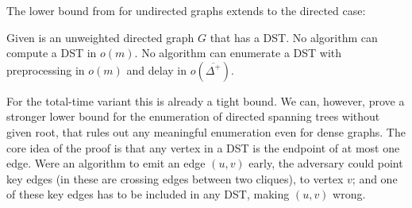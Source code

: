 \documentclass[a4paper, USenglish, cleveref, autoref, thm-restate]{lipics-v2021}
\newcommand{\avgoutdeg}{\overline{\Delta^+}}
\begin{document}
The lower bound from  for undirected graphs extends to the directed case:
\begin{corollary}
	\label{cor:dst-lower}
	Given is an unweighted directed graph $G$ that has a DST.
	No algorithm can compute a DST in $o(m)$.
	No algorithm can enumerate a DST with preprocessing in $o(m)$ and delay in $o(\avgoutdeg)$.
\end{corollary}

For the total-time variant this is already a tight bound.
We can, however, prove a stronger lower bound for the enumeration of directed spanning trees without given root, that rules out any meaningful enumeration even for dense graphs.
The core idea of the proof is that any vertex in a DST is the endpoint of at most one edge.
Were an algorithm to emit an edge $(u,v)$ early, the adversary could point key edges (in  these are crossing edges between two cliques), to vertex $v$; and one of these key edges has to be included in any DST, making $(u,v)$ wrong.
\end{document}
